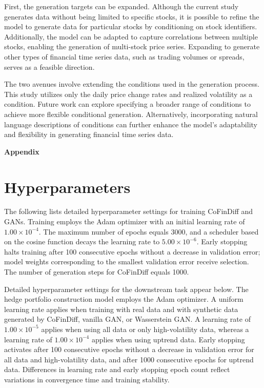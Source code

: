 \documentclass{article}
\begin{document}
First, the generation targets can be expanded. Although the current study generates data without being limited to specific stocks, it is possible to refine the model to generate data for particular stocks by conditioning on stock identifiers. Additionally, the model can be adapted to capture correlations between multiple stocks, enabling the generation of multi-stock price series. Expanding to generate other types of financial time series data, such as trading volumes or spreads, serves as a feasible direction.

The two avenues involve extending the conditions used in the generation process. This study utilizes only the daily price change rates and realized volatility as a condition. Future work can explore specifying a broader range of conditions to achieve more flexible conditional generation. Alternatively, incorporating natural language descriptions of conditions can further enhance the model's adaptability and flexibility in generating financial time series data.





\clearpage

\appendix
{
\noindent\Large\bfseries Appendix
}

\section{Hyperparameters}

The following lists detailed hyperparameter settings for training CoFinDiff and GANs. Training employs the Adam optimizer with an initial learning rate of $1.00 \times 10^{-4}$. The maximum number of epochs equals 3000, and a scheduler based on the cosine function decays the learning rate to $5.00 \times 10^{-6}$. Early stopping halts training after 100 consecutive epochs without a decrease in validation error; model weights corresponding to the smallest validation error receive selection. The number of generation steps for CoFinDiff equals 1000.

Detailed hyperparameter settings for the downstream task appear below. The hedge portfolio construction model employs the Adam optimizer. A uniform learning rate applies when training with real data and with synthetic data generated by CoFinDiff, vanilla GAN, or Wasserstein GAN. A learning rate of $1.00 \times 10^{-5}$ applies when using all data or only high-volatility data, whereas a learning rate of $1.00 \times 10^{-4}$ applies when using uptrend data. Early stopping activates after 100 consecutive epochs without a decrease in validation error for all data and high-volatility data, and after 1000 consecutive epochs for uptrend data. Differences in learning rate and early stopping epoch count reflect variations in convergence time and training stability.
\end{document}
